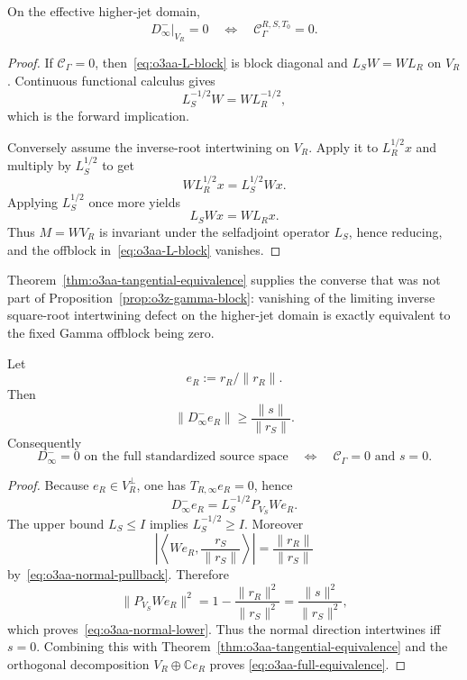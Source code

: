 \begin{theorem}
\label{thm:o3aa-tangential-equivalence}
On the effective higher-jet domain,
\[
 \boxed{
 D_\infty^-|_{V_R}=0
 \quad\Longleftrightarrow\quad
 \mathscr C_\Gamma^{R,S,T_0}=0.
 }
\tag{O3AA.16}\label{eq:o3aa-tangential-equivalence}
\]
\end{theorem}

\begin{proof}
If $\mathscr C_\Gamma=0$, then~\eqref{eq:o3aa-L-block} is block diagonal and
$L_SW=WL_R$ on $V_R$.  Continuous functional calculus gives
\[
 L_S^{-1/2}W=WL_R^{-1/2},
\]
which is the forward implication.

Conversely assume the inverse-root intertwining on $V_R$.  Apply it to
$L_R^{1/2}x$ and multiply by $L_S^{1/2}$ to get
\[
 WL_R^{1/2}x=L_S^{1/2}Wx.
\]
Applying $L_S^{1/2}$ once more yields
\[
 L_SWx=WL_Rx.
\]
Thus $M=WV_R$ is invariant under the selfadjoint operator $L_S$, hence reducing, and
the offblock in~\eqref{eq:o3aa-L-block} vanishes.
\end{proof}

Theorem~\ref{thm:o3aa-tangential-equivalence} supplies the converse that was not part of
Proposition~\ref{prop:o3z-gamma-block}: vanishing of the limiting inverse square-root
intertwining defect on the higher-jet domain is exactly equivalent to the fixed Gamma
offblock being zero.

\begin{theorem}
\label{thm:o3aa-full-equivalence}
Let
\[
 e_R:=r_R/\|r_R\|.
\]
Then
\[
 \boxed{
 \|D_\infty^-e_R\|
 \ge\frac{\|s\|}{\|r_S\|}.
 }
\tag{O3AA.17}\label{eq:o3aa-normal-lower}
\]
Consequently
\[
 \boxed{
 D_\infty^-=0
 \text{ on the full standardized source space}
 \quad\Longleftrightarrow\quad
 \mathscr C_\Gamma=0
 \text{ and }s=0.
 }
\tag{O3AA.18}\label{eq:o3aa-full-equivalence}
\]
\end{theorem}

\begin{proof}
Because $e_R\in V_R^\perp$, one has $T_{R,\infty}e_R=0$, hence
\[
 D_\infty^-e_R=L_S^{-1/2}P_{V_S}We_R.
\]
The upper bound $L_S\le I$ implies $L_S^{-1/2}\ge I$.  Moreover
\[
 \left|
 \left\langle We_R,\frac{r_S}{\|r_S\|}\right\rangle
 \right|
 =\frac{\|r_R\|}{\|r_S\|}
\]
by~\eqref{eq:o3aa-normal-pullback}.  Therefore
\[
 \|P_{V_S}We_R\|^2
 =1-\frac{\|r_R\|^2}{\|r_S\|^2}
 =\frac{\|s\|^2}{\|r_S\|^2},
\]
which proves~\eqref{eq:o3aa-normal-lower}.  Thus the normal direction intertwines iff
$s=0$.  Combining this with Theorem~\ref{thm:o3aa-tangential-equivalence} and the
orthogonal decomposition $V_R\oplus\mathbb Ce_R$ proves
\eqref{eq:o3aa-full-equivalence}.
\end{proof}

